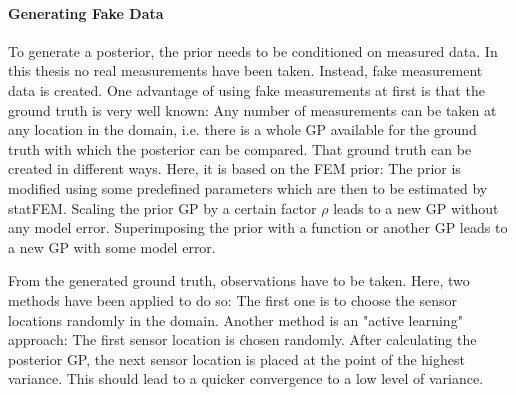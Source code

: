 \documentclass[%
  a4paper,oneside,%
  11pt,%
  smallchapters,
  style=printdev,
  extramargin,
  green,%
  rgb, <cmyk>
  ]{tubsbook}
\begin{document}
\paragraph{Generating Fake Data}
To generate a posterior, the prior needs to be conditioned on measured data. In this thesis no real measurements have been taken. Instead, fake measurement data is created. One advantage of using fake measurements at first is that the ground truth is very well known: Any number of measurements can be taken at any location in the domain, i.e. there is a whole GP available for the ground truth with which the posterior can be compared.
That ground truth can be created in different ways. Here, it is based on the FEM prior: The prior is modified using some predefined parameters which are then to be estimated by statFEM. Scaling the prior GP by a certain factor $\rho$ leads to a new GP without any model error. Superimposing the prior with a function or another GP leads to a new GP with some model error.

From the generated ground truth, observations have to be taken. Here, two methods have been applied to do so: The first one is to choose the sensor locations randomly in the domain. Another method is an "active learning" approach: The first sensor location is chosen randomly. After calculating the posterior GP, the next sensor location is placed at the point of the highest variance. This should lead to a quicker convergence to a low level of variance.
\end{document}
